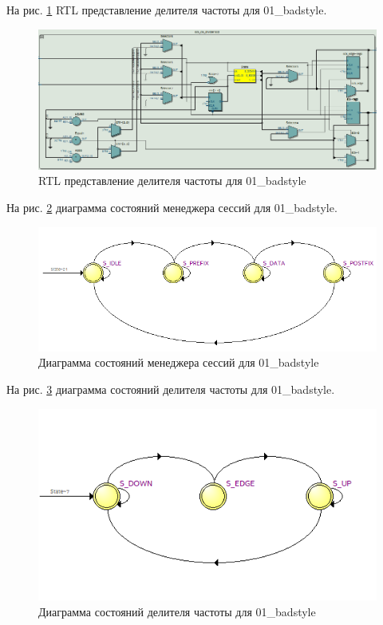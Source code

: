 \documentclass[a4paper,14pt]{article}
\begin{document}
	На рис. \ref{fig:z15rtlclkdivider} RTL представление делителя частоты для 01\_badstyle.
	
	\begin{figure}[H]
		\centering
		\includegraphics[width=0.9\linewidth]{images/z1_5_rtl_clk_divider}
		\caption{RTL представление делителя частоты для 01\_badstyle}
		\label{fig:z15rtlclkdivider}
	\end{figure}

	На рис. \ref{fig:z15auto} диаграмма состояний менеджера сессий для 01\_badstyle.
	
	\begin{figure}[H]
		\centering
		\includegraphics[width=0.6\linewidth]{images/z1_5_auto}
		\caption{Диаграмма состояний менеджера сессий для 01\_badstyle}
		\label{fig:z15auto}
	\end{figure}
	
	На рис. \ref{fig:z15autoclkdivider} диаграмма состояний делителя частоты для 01\_badstyle.
	
	\begin{figure}[H]
		\centering
		\includegraphics[width=0.6\linewidth]{images/z1_5_auto_clk_divider}
		\caption{Диаграмма состояний делителя частоты для 01\_badstyle}
		\label{fig:z15autoclkdivider}
	\end{figure}
\end{document}

